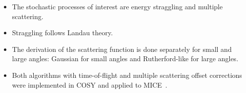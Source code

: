 \documentclass[portrait,a0paper,fontscale=0.285]{baposter} %
\begin{document}
\begin{poster}
{
\begin{itemize}
\item The stochastic processes of interest are energy straggling and multiple scattering.
\item Straggling follows Landau theory.
\item The derivation of the scattering function is done separately for small and large angles: Gaussian for small angles and Rutherford-like for large angles.
\item Both algorithms with time-of-flight and multiple scattering offset corrections were implemented in COSY and applied to MICE~\cite{mice}.
\end{itemize}
}




\end{poster}
\end{document}
